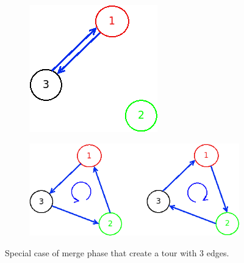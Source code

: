\begin{figure}[!h]
	\hfill%
	\begin{subfigure}{.2\columnwidth}
		\includegraphics[width=\columnwidth]{img/patching_merge_clockwise1.png}
		\caption{}
		\label{fig:patching_merge_clockwise1}
	\end{subfigure}
\hfill%
	\begin{subfigure}{.46\columnwidth}
		\includegraphics[width=\columnwidth]{img/patching_merge_clockwise2.png}
		\caption{}
		\label{fig:patching_merge_clockwise2}
	\end{subfigure}
\hfill%
	\caption{Special case of merge phase that create a tour with 3 edges.}
	\label{fig:patching_merge_clockwise}
\end{figure}
